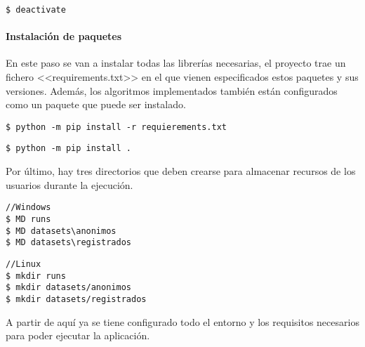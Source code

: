\begin{tcolorbox}[colback=cyan!5!white,colframe=cyan!75!black,title=Para desactivar el entorno (una vez en él)]
\begin{verbatim}
$ deactivate
\end{verbatim}
\end{tcolorbox}
\paragraph{Instalación de paquetes} En este paso se van a instalar todas las
librerías necesarias, el proyecto trae un fichero <<requirements.txt>> en el que
vienen especificados estos paquetes y sus versiones. Además, los algoritmos
implementados también están configurados como un paquete que puede ser
instalado.
\begin{tcolorbox}[colback=cyan!5!white,colframe=orange!75!black,title=Instalar librerías externas]
\begin{verbatim}
$ python -m pip install -r requierements.txt
\end{verbatim}
\end{tcolorbox}

\begin{tcolorbox}[colback=cyan!5!white,colframe=orange!75!black,title=Instalar resto de paquetes (principalmente los algoritmos)]
\begin{verbatim}
$ python -m pip install .
\end{verbatim}
\end{tcolorbox}

Por último, hay tres directorios que deben crearse para almacenar recursos de
los usuarios durante la ejecución.

\begin{tcolorbox}[colback=cyan!5!white,colframe=cyan!75!black,fontupper=\footnotesize,fontlower=\footnotesize,title=Creación de directorios (desde \texttt{/web/app})]
\begin{verbatim}
//Windows
$ MD runs
$ MD datasets\anonimos
$ MD datasets\registrados
\end{verbatim}
\tcblower
\begin{verbatim}
//Linux
$ mkdir runs
$ mkdir datasets/anonimos
$ mkdir datasets/registrados
\end{verbatim}
\end{tcolorbox}


A partir de aquí ya se tiene configurado todo el entorno y los requisitos
necesarios para poder ejecutar la aplicación.

